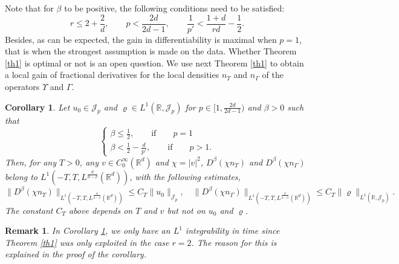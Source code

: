 \documentclass[12pt]{article}
\newtheorem{corollary}[theorem]{Corollary}
\newtheorem{remark}[theorem]{Remark}
\def \Rm {\mathbb R}
\newcommand{\ds}{\displaystyle}
\newcommand{\calJ}{\mathcal J}
\begin{document}
Note that for $\beta$ to be positive,  the following conditions need to be satisfied:
$$
r\leq 2+\frac{2}{d}, \qquad p <\frac{2d}{2d-1}, \qquad \frac{1}{p'}<\frac{1+d}{rd}-\frac{1}{2}.
$$
Besides, as can be expected, the gain in differentiability is maximal when $p=1$, that is when the strongest assumption is made on the data. Whether Theorem \ref{th1} is optimal or not is an open question. We use next Theorem \ref{th1} to obtain a local gain of fractional derivatives for the local densities $n_\Upsilon$ and $n_\Gamma$ of the operators $\Upsilon$ and $\Gamma$.
\begin{corollary} \label{cor1} Let $u_0 \in \calJ_p$ and $\varrho \in L^1(\Rm, \calJ_p)$ for $p \in [1,\frac{2d}{2d-1})$ and $\beta > 0$ such that 
$$
\left\{
\begin{array}{l} \ds
\beta \leq \frac{1}{2}, \qquad \textrm{if} \qquad p=1\\[2mm]
\ds \beta < \frac{1}{2}-\frac{d}{p'}, \qquad \textrm{if} \qquad  p>1.
\end{array}
\right. 
$$ Then, for any $T>0$, any $v \in C_0^\infty(\Rm^d)$ and $\chi=|v|^2$, $D^\beta(\chi n_{\Upsilon})$ and $D^\beta(\chi n_{\Gamma})$ belong to $L^1(-T,T,L^{\frac{d}{d-\beta}}(\Rm^d))$, with the following estimates,
$$
\| D^\beta(\chi n_{\Upsilon}) \|_{L^1(-T,T,L^{\frac{d}{d-\beta}}(\Rm^d))}  \leq C_T \|u_0\|_{\calJ_p}, \quad \| D^\beta(\chi n_{\Gamma})\|_{L^1(-T,T,L^{\frac{d}{d-\beta}}(\Rm^d))} \leq C_T \|\varrho\|_{L^1(\Rm,\calJ_p)}.
$$
The constant $C_T$ above depends on $T$ and $v$ but not on $u_0$ and $\varrho$.
\end{corollary}
\begin{remark} \label{intime} In Corollary \ref{cor1}, we only have an $L^1$ integrability in time since Theorem \ref{th1} was only exploited in the case $r=2$. The reason for this is explained in the proof of the corollary.%
\end{remark}
\end{document}
